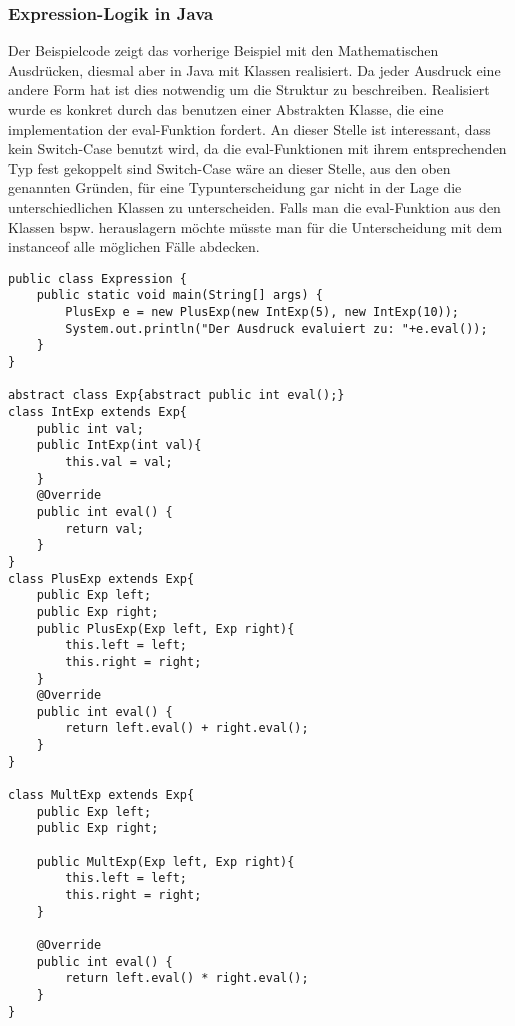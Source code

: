 \documentclass[a4paper, 1ppt]{article}
\begin{document}
\subsubsection{Expression-Logik in Java}
Der Beispielcode zeigt das vorherige Beispiel mit den Mathematischen Ausdrücken, diesmal aber in Java mit Klassen realisiert. Da jeder Ausdruck eine andere Form hat ist dies notwendig um die Struktur zu beschreiben.
Realisiert wurde es konkret durch das benutzen einer Abstrakten Klasse, die eine implementation der eval-Funktion fordert.
An dieser Stelle ist interessant, dass kein Switch-Case benutzt wird, da die eval-Funktionen mit ihrem entsprechenden Typ fest gekoppelt sind
Switch-Case wäre an dieser Stelle, aus den oben genannten Gründen, für eine Typunterscheidung gar nicht in der Lage die unterschiedlichen Klassen zu unterscheiden. 
Falls man die eval-Funktion aus den Klassen bspw. herauslagern möchte müsste man für die Unterscheidung mit dem instanceof alle möglichen Fälle abdecken.
\begin{verbatim}
public class Expression {
    public static void main(String[] args) {
        PlusExp e = new PlusExp(new IntExp(5), new IntExp(10));
        System.out.println("Der Ausdruck evaluiert zu: "+e.eval());
    }
}

abstract class Exp{abstract public int eval();}
class IntExp extends Exp{
    public int val;
    public IntExp(int val){
        this.val = val;
    }
    @Override
    public int eval() {
        return val;
    }
}
class PlusExp extends Exp{
    public Exp left;
    public Exp right;
    public PlusExp(Exp left, Exp right){
        this.left = left;
        this.right = right;
    }
    @Override
    public int eval() {
        return left.eval() + right.eval();
    }
}

class MultExp extends Exp{
    public Exp left;
    public Exp right;

    public MultExp(Exp left, Exp right){
        this.left = left;
        this.right = right;
    }

    @Override
    public int eval() {
        return left.eval() * right.eval();
    }
}
\end{verbatim}
\end{document}

